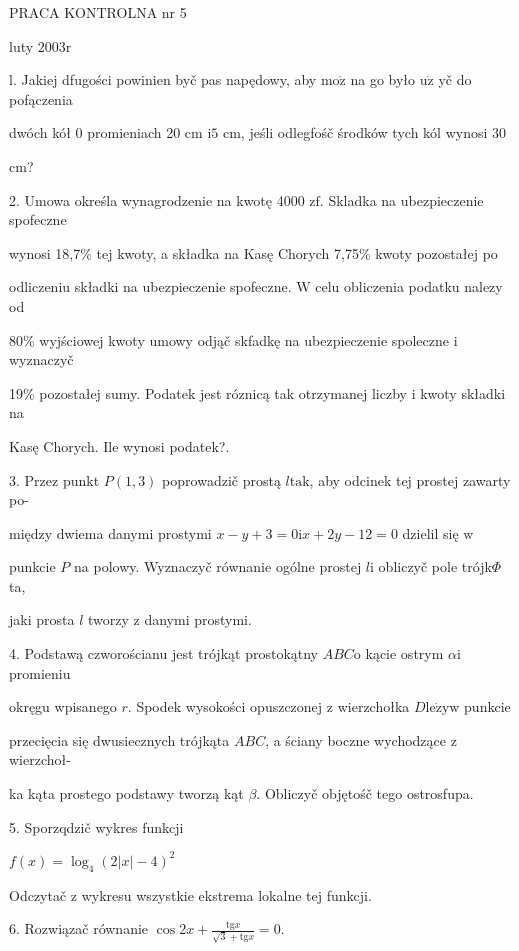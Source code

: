 \documentclass[a4paper,12pt]{article}
\begin{document}
PRACA KONTROLNA nr 5

luty $2003\mathrm{r}$

l. Jakiej dfugości powinien byč pas napędowy, aby $\mathrm{m}\mathrm{o}\dot{\mathrm{z}}$ na go było $\mathrm{u}\dot{\mathrm{z}}$ yč do pofączenia

dwóch kół $0$ promieniach 20 cm $\mathrm{i}5$ cm, jeśli odlegfośč środków tych kól wynosi 30

cm?

2. Umowa określa wynagrodzenie na kwotę 4000 $\mathrm{z}\mathrm{f}$. Skladka na ubezpieczenie spofeczne

wynosi 18,7\% tej kwoty, a składka na Kasę Chorych 7,75\% kwoty pozostałej po

odliczeniu składki na ubezpieczenie spofeczne. $\mathrm{W}$ celu obliczenia podatku nalezy od

80\% wyjściowej kwoty umowy odjąč skfadkę na ubezpieczenie spoleczne $\mathrm{i}$ wyznaczyč

19\% pozostałej sumy. Podatek jest róznicą tak otrzymanej liczby $\mathrm{i}$ kwoty składki na

Kasę Chorych. Ile wynosi podatek?.

3. Przez punkt $P(1,3)$ poprowadzič prostą $l\mathrm{t}\mathrm{a}\mathrm{k}$, aby odcinek tej prostej zawarty po-

między dwiema danymi prostymi $x-y+3 = 0 \mathrm{i}x+2y-12 = 0$ dzielil się $\mathrm{w}$

punkcie $P$ na polowy. Wyznaczyč równanie ogólne prostej $l\mathrm{i}$ obliczyč pole trójk$\Phi$ta,

jaki prosta $l$ tworzy $\mathrm{z}$ danymi prostymi.

4. Podstawą czworościanu jest trójkąt prostokątny $ABC\mathrm{o}$ kącie ostrym $\alpha \mathrm{i}$ promieniu

okręgu wpisanego $r$. Spodek wysokości opuszczonej $\mathrm{z}$ wierzchołka $D\mathrm{l}\mathrm{e}\dot{\mathrm{z}}\mathrm{y}\mathrm{w}$ punkcie

przecięcia się dwusiecznych trójkąta $ABC$, a ściany boczne wychodzące $\mathrm{z}$ wierzchoł-

ka kąta prostego podstawy tworzą kąt $\beta$. Obliczyč objętośč tego ostrosfupa.

5. Sporzqdzič wykres funkcji

$f(x)=\log_{4}(2|x|-4)^{2}$

Odczytač $\mathrm{z}$ wykresu wszystkie ekstrema lokalne tej funkcji.

6. Rozwiązač równanie $\displaystyle \cos 2x+\frac{\mathrm{t}\mathrm{g}x}{\sqrt{3}+\mathrm{t}\mathrm{g}x}=0.$
\end{document}
